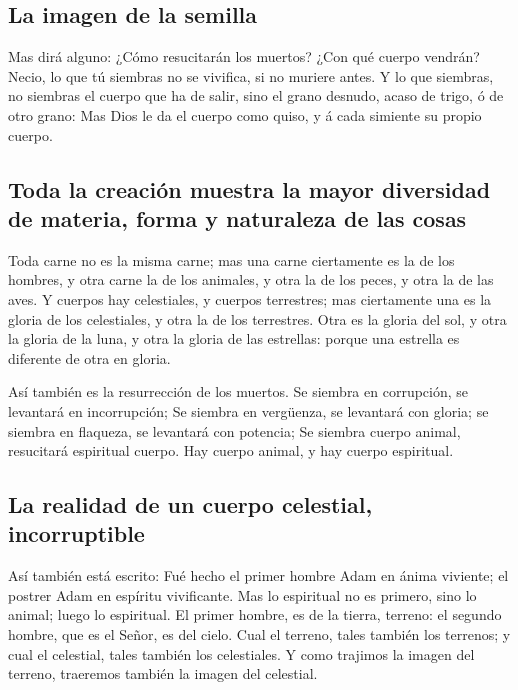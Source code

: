 \hypertarget{la-imagen-de-la-semilla}{%
\subsection{La imagen de la semilla}\label{la-imagen-de-la-semilla}}

 Mas dirá alguno: ¿Cómo resucitarán los muertos? ¿Con qué
cuerpo vendrán?  Necio, lo que tú siembras no se vivifica,
si no muriere antes.  Y lo que siembras, no siembras el
cuerpo que ha de salir, sino el grano desnudo, acaso de trigo, ó de otro
grano:  Mas Dios le da el cuerpo como quiso, y á cada
simiente su propio cuerpo.

\hypertarget{toda-la-creaciuxf3n-muestra-la-mayor-diversidad-de-materia-forma-y-naturaleza-de-las-cosas}{%
\subsection{Toda la creación muestra la mayor diversidad de materia,
forma y naturaleza de las
cosas}\label{toda-la-creaciuxf3n-muestra-la-mayor-diversidad-de-materia-forma-y-naturaleza-de-las-cosas}}

 Toda carne no es la misma carne; mas una carne ciertamente
es la de los hombres, y otra carne la de los animales, y otra la de los
peces, y otra la de las aves.  Y cuerpos hay celestiales, y
cuerpos terrestres; mas ciertamente una es la gloria de los celestiales,
y otra la de los terrestres.  Otra es la gloria del sol, y
otra la gloria de la luna, y otra la gloria de las estrellas: porque una
estrella es diferente de otra en gloria.

 Así también es la resurrección de los muertos. Se siembra
en corrupción, se levantará en incorrupción;  Se siembra en
vergüenza, se levantará con gloria; se siembra en flaqueza, se levantará
con potencia;  Se siembra cuerpo animal, resucitará
espiritual cuerpo. Hay cuerpo animal, y hay cuerpo espiritual.

\hypertarget{la-realidad-de-un-cuerpo-celestial-incorruptible}{%
\subsection{La realidad de un cuerpo celestial,
incorruptible}\label{la-realidad-de-un-cuerpo-celestial-incorruptible}}

 Así también está escrito: Fué hecho el primer hombre Adam
en ánima viviente; el postrer Adam en espíritu vivificante.
 Mas lo espiritual no es primero, sino lo animal; luego lo
espiritual.  El primer hombre, es de la tierra, terreno: el
segundo hombre, que es el Señor, es del cielo.  Cual el
terreno, tales también los terrenos; y cual el celestial, tales también
los celestiales.  Y como trajimos la imagen del terreno,
traeremos también la imagen del celestial.

